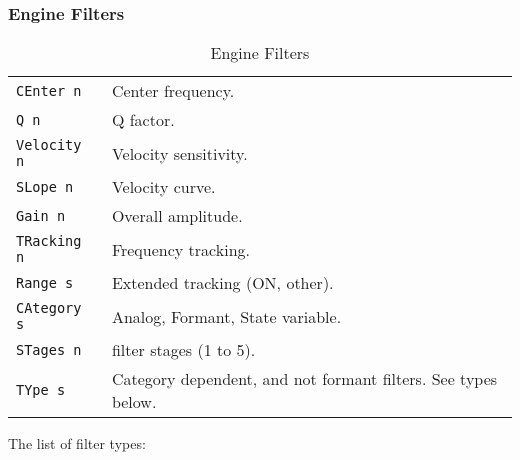 \subsubsection{Engine Filters}
\label{subsec:command_line_engine_filters}

   \begin{table}[H]
      \centering
      \caption{Engine Filters}
      \label{table:yoshimi_engine_filters}
      \begin{tabular}{l l}

\texttt{CEnter n} &
   Center frequency. \\
\texttt{Q n} &
   Q factor.   \\
\texttt{Velocity n} &
   Velocity sensitivity.   \\
\texttt{SLope n} &
   Velocity curve.   \\
\texttt{Gain n} &
   Overall amplitude.   \\
\texttt{TRacking n} &
   Frequency tracking.  \\
\texttt{Range s} &
   Extended tracking (ON, {other}). \\
\texttt{CAtegory s} &
   Analog, Formant, State variable. \\
\texttt{STages n} &
   filter stages (1 to 5). \\
\texttt{TYpe s} &
   Category dependent, and not formant filters.  See types below.   \\

      \end{tabular}
   \end{table}

   The list of filter types:

